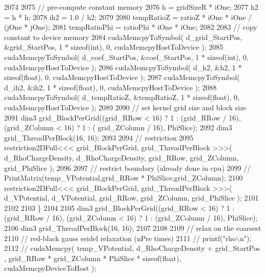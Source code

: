 \begin{DoxyCode}
2074 
2075         \textcolor{comment}{// pre-compute constant memory}
2076         h   = gridSizeR * iOne;
2077         h2  = h * h;
2078         ih2 = 1.0 / h2;
2079 
2080         tempRatioZ = ratioZ * iOne * iOne / (jOne * jOne);
2081         tempRatioPhi = ratioPhi * iOne * iOne;
2082 
2083         \textcolor{comment}{// copy constant to device memory}
2084         cudaMemcpyToSymbol( d\_grid\_StartPos, &grid\_StartPos, 1 * \textcolor{keyword}{sizeof}(\textcolor{keywordtype}{int}), 0, cudaMemcpyHostToDevice );
2085         cudaMemcpyToSymbol( d\_coef\_StartPos, &coef\_StartPos, 1 * \textcolor{keyword}{sizeof}(\textcolor{keywordtype}{int}), 0, cudaMemcpyHostToDevice );
2086         cudaMemcpyToSymbol( d\_h2, &h2, 1 * \textcolor{keyword}{sizeof}(\textcolor{keywordtype}{float}), 0, cudaMemcpyHostToDevice );
2087         cudaMemcpyToSymbol( d\_ih2, &ih2, 1 * \textcolor{keyword}{sizeof}(\textcolor{keywordtype}{float}), 0, cudaMemcpyHostToDevice );
2088         cudaMemcpyToSymbol( d\_tempRatioZ, &tempRatioZ, 1 * \textcolor{keyword}{sizeof}(\textcolor{keywordtype}{float}), 0, cudaMemcpyHostToDevice );
2089 
2090         \textcolor{comment}{// set kernel grid size and block size}
2091         dim3 grid\_BlockPerGrid((grid\_RRow < 16) ? 1 : (grid\_RRow / 16), (grid\_ZColumn < 16) ? 1 : (
      grid\_ZColumn / 16), PhiSlice);
2092         dim3 grid\_ThreadPerBlock(16, 16);
2093 
2094         \textcolor{comment}{// restriction}
2095         restriction2DFull<<< grid\_BlockPerGrid, grid\_ThreadPerBlock >>>( d\_RhoChargeDensity, 
      d\_RhoChargeDensity, grid\_RRow, grid\_ZColumn, grid\_PhiSlice );
2096         
2097         \textcolor{comment}{// restrict boundary (already done in cpu)}
2099 \textcolor{comment}{}\textcolor{comment}{//      PrintMatrix(temp\_VPotential,grid\_RRow * PhiSlice,grid\_ZColumn);}
2100         restriction2DFull<<< grid\_BlockPerGrid, grid\_ThreadPerBlock >>>( d\_VPotential, d\_VPotential, 
      grid\_RRow, grid\_ZColumn, grid\_PhiSlice );
2101 
2102         
2103     \}
2104 
2105     dim3 grid\_BlockPerGrid((grid\_RRow < 16) ? 1 : (grid\_RRow / 16), (grid\_ZColumn < 16) ? 1 : (grid\_ZColumn
       / 16), PhiSlice);
2106     dim3 grid\_ThreadPerBlock(16, 16);
2107 
2108 
2109     \textcolor{comment}{// relax on the coarsest }
2110     \textcolor{comment}{// red-black gauss seidel relaxation (nPre times)}
2111 \textcolor{comment}{//  printf("rho\(\backslash\)n");}
2112 \textcolor{comment}{//  cudaMemcpy( temp\_VPotential, d\_RhoChargeDensity + grid\_StartPos , grid\_RRow * grid\_ZColumn * PhiSlice *
       sizeof(float), cudaMemcpyDeviceToHost );}

\end{DoxyCode}
